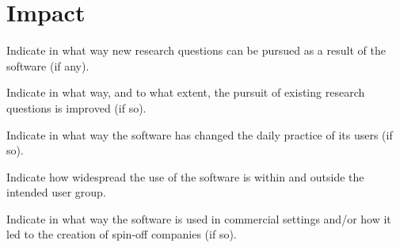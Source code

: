 \section{Impact}
\label{} 

Indicate in what way new research questions can be pursued as a result of the software (if any).


Indicate in what way, and to what extent, the pursuit of existing research questions is improved (if so).


Indicate in what way the software has changed the daily practice of its users (if so).


Indicate how widespread the use of the software is within and outside the intended user group.


Indicate in what way the software is used in commercial settings and/or how it led to the creation of spin-off companies (if so).
